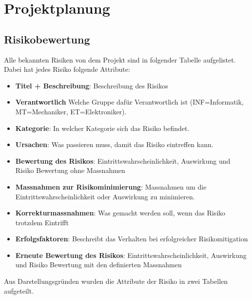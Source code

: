 \documentclass[../main.tex]{subfiles}
\begin{document}
\newpage
\section{Projektplanung}

\subsection{Risikobewertung}

Alle bekannten Risiken von dem Projekt sind in folgender Tabelle aufgelistet.
Dabei hat jedes Risiko folgende Attribute:
\begin{itemize}
    \item \textbf{Titel + Beschreibung}: Beschreibung des Risikos
    \item \textbf{Verantwortlich} Welche Gruppe dafür Verantwortlich ist (INF=Informatik, MT=Mechaniker, ET=Elektroniker).
    \item \textbf{Kategorie}: In welcher Kategorie sich das Risiko befindet.
    \item \textbf{Ursachen}: Was passieren muss, damit das Risiko eintreffen kann.
    \item \textbf{Bewertung des Risikos}: Eintrittswahrscheinlichkeit, Auswirkung und Risiko Bewertung ohne Massnahmen
    \item \textbf{Massnahmen zur Risikominimierung}: Massnahmen um die Eintrittswahrscheinlichkeit oder Auswirkung zu minimieren.
    \item \textbf{Korrekturmassnahmen}: Was gemacht werden soll, wenn das Risiko trotzdem Eintrifft
    \item \textbf{Erfolgsfaktoren}: Beschreibt das Verhalten bei erfolgreicher Risikomitigation
    \item \textbf{Erneute Bewertung des Risikos}: Eintrittswahrscheinlichkeit, Auswirkung und Risiko Bewertung mit den definierten Massnahmen
\end{itemize}

Aus Darstellungsgründen wurden die Attribute der Risiko in zwei Tabellen aufgeteilt.
\end{document}
